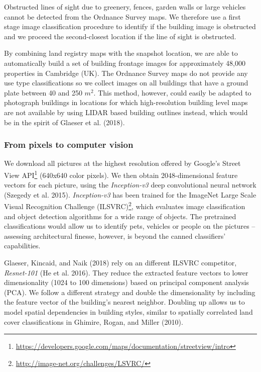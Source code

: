 \documentclass[]{article}
\let\rmarkdownfootnote\footnote%
\def\footnote{\protect\rmarkdownfootnote}
\begin{document}
Obstructed lines of sight due to greenery, fences, garden walls or large
vehicles cannot be detected from the Ordnance Survey maps. We therefore
use a first stage image classification procedure to identify if the
building image is obstructed and we proceed the second-closest location
if the line of sight is obstructed.

By combining land registry maps with the snapshot location, we are able
to automatically build a set of building frontage images for
approximately 48,000 properties in Cambridge (UK). The Ordnance Survey
maps do not provide any use type classifications so we collect images on
all buildings that have a ground plate between 40 and 250 \(m^2\). This
method, however, could easily be adapted to photograph buildings in
locations for which high-resolution building level maps are not
available by using LIDAR based building outlines instead, which would be
in the spirit of Glaeser et al. (2018).

\hypertarget{from-pixels-to-computer-vision}{%
\subsubsection{From pixels to computer
vision}\label{from-pixels-to-computer-vision}}

We download all pictures at the highest resolution offered by Google's
Street View
API\footnote{\href{https://developers.google.com/maps/documentation/streetview/intro}{https://developers.google.com/maps/documentation/streetview/intro}}
(640x640 color pixels). We then obtain 2048-dimensional feature vectors
for each picture, using the \emph{Inception-v3} deep convolutional
neural network (Szegedy et al. 2015). \emph{Inception-v3} has been
trained for the ImageNet Large Scale Visual Recognition Challenge
(ILSVRC)\footnote{\url{http://image-net.org/challenges/LSVRC/}}, which
evaluates image classification and object detection algorithms for a
wide range of objects. The pretrained classifications would allow us to
identify pets, vehicles or people on the pictures -- assessing
architectural finesse, however, is beyond the canned classifiers'
capabilities.

Glaeser, Kincaid, and Naik (2018) rely on an different ILSVRC
competitor, \emph{Resnet-101} (He et al. 2016). They reduce the
extracted feature vectors to lower dimensionality (1024 to 100
dimensions) based on principal component analysis (PCA). We follow a
different strategy and double the dimensionality by including the
feature vector of the building's nearest neighbor. Doubling up allows us
to model spatial dependencies in building styles, similar to spatially
correlated land cover classifications in Ghimire, Rogan, and Miller
(2010).
\end{document}
